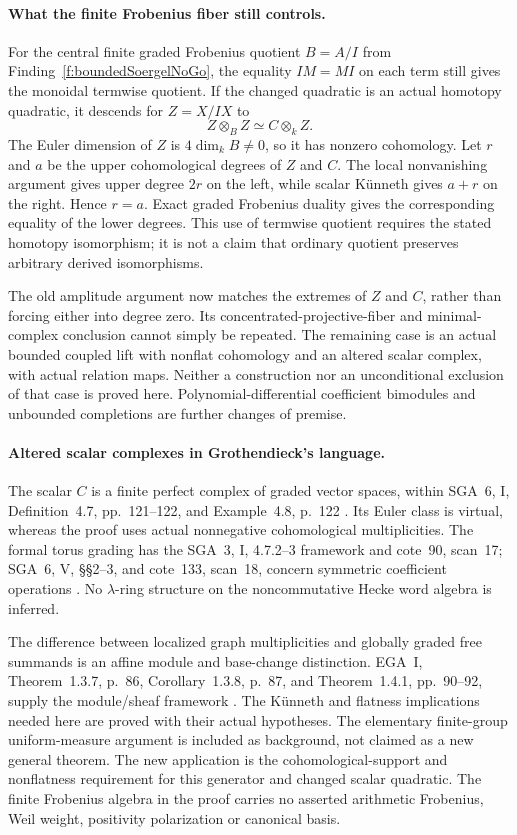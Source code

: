 \paragraph{What the finite Frobenius fiber still controls.}
For the central finite graded Frobenius quotient \(B=A/I\)
from Finding~\ref{f:boundedSoergelNoGo}, the equality
\(IM=MI\) on each term still gives the monoidal termwise
quotient. If the changed quadratic is an actual homotopy
quadratic, it descends for \(Z=X/IX\) to
\[
                     Z\otimes_B Z\simeq C\otimes_k Z.
\]
The Euler dimension of \(Z\) is \(4\dim_kB\ne0\),
so it has nonzero cohomology. Let \(r\) and \(a\)
be the upper cohomological degrees of \(Z\) and \(C\).
The local nonvanishing argument gives upper degree
\(2r\) on the left, while scalar K\"unneth gives
\(a+r\) on the right. Hence \(r=a\).
Exact graded Frobenius duality gives the corresponding
equality of the lower degrees. This use of termwise
quotient requires the stated homotopy isomorphism;
it is not a claim that ordinary quotient preserves
arbitrary derived isomorphisms.

The old amplitude argument now matches the extremes
of \(Z\) and \(C\), rather than forcing either into
degree zero. Its concentrated-projective-fiber and
minimal-complex conclusion cannot simply be repeated.
The remaining case is an actual bounded coupled lift
with nonflat cohomology and an altered scalar complex,
with actual relation maps. Neither a construction nor
an unconditional exclusion of that case is proved here.
Polynomial-differential coefficient bimodules and
unbounded completions are further changes of premise.

\paragraph{Altered scalar complexes in Grothendieck's language.}
The scalar \(C\) is a finite perfect complex of graded
vector spaces, within SGA~6, I, Definition~4.7,
pp.~121--122, and Example~4.8, p.~122 \cite{SGA6}.
Its Euler class is virtual, whereas the proof uses
actual nonnegative cohomological multiplicities.
The formal torus grading has the SGA~3, I, 4.7.2--3
framework and cote~90, scan~17; SGA~6, V, \S\S2--3,
and cote~133, scan~18, concern symmetric coefficient
operations \cite{SGA3,SGA6,Archive}.
No \(\lambda\)-ring structure on the noncommutative
Hecke word algebra is inferred.

The difference between localized graph multiplicities
and globally graded free summands is an affine module
and base-change distinction. EGA~I, Theorem~1.3.7,
p.~86, Corollary~1.3.8, p.~87, and Theorem~1.4.1,
pp.~90--92, supply the module/sheaf framework \cite{EGA}.
The K\"unneth and flatness implications needed here are
proved with their actual hypotheses. The elementary
finite-group uniform-measure argument is included as
background, not claimed as a new general theorem.
The new application is the cohomological-support and
nonflatness requirement for this generator and changed
scalar quadratic. The finite Frobenius algebra in
the proof carries no asserted arithmetic Frobenius,
Weil weight, positivity polarization or canonical basis.
